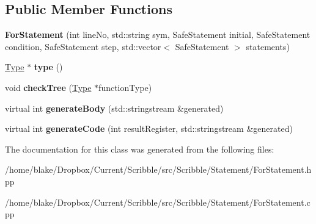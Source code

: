 \subsection*{Public Member Functions}
\begin{DoxyCompactItemize}
\item 
\hypertarget{class_scribble_core_1_1_for_statement_a3a1f10df3149454ad762a3ea291e8ade}{{\bfseries For\-Statement} (int line\-No, std\-::string sym, Safe\-Statement initial, Safe\-Statement condition, Safe\-Statement step, std\-::vector$<$ Safe\-Statement $>$ statements)}\label{class_scribble_core_1_1_for_statement_a3a1f10df3149454ad762a3ea291e8ade}

\item 
\hypertarget{class_scribble_core_1_1_for_statement_a386871e99b23b5f1244691d331c8135b}{\hyperlink{class_scribble_core_1_1_type}{Type} $\ast$ {\bfseries type} ()}\label{class_scribble_core_1_1_for_statement_a386871e99b23b5f1244691d331c8135b}

\item 
\hypertarget{class_scribble_core_1_1_for_statement_a91e40d9fd84d15bc28cd7fafa6be5aa2}{void {\bfseries check\-Tree} (\hyperlink{class_scribble_core_1_1_type}{Type} $\ast$function\-Type)}\label{class_scribble_core_1_1_for_statement_a91e40d9fd84d15bc28cd7fafa6be5aa2}

\item 
\hypertarget{class_scribble_core_1_1_for_statement_a0e5835e399600380f0b5485ca4e49f6e}{virtual int {\bfseries generate\-Body} (std\-::stringstream \&generated)}\label{class_scribble_core_1_1_for_statement_a0e5835e399600380f0b5485ca4e49f6e}

\item 
\hypertarget{class_scribble_core_1_1_for_statement_a342b11d90c876e6c4da5364947b8f34d}{virtual int {\bfseries generate\-Code} (int result\-Register, std\-::stringstream \&generated)}\label{class_scribble_core_1_1_for_statement_a342b11d90c876e6c4da5364947b8f34d}

\end{DoxyCompactItemize}


The documentation for this class was generated from the following files\-:\begin{DoxyCompactItemize}
\item 
/home/blake/\-Dropbox/\-Current/\-Scribble/src/\-Scribble/\-Statement/For\-Statement.\-hpp\item 
/home/blake/\-Dropbox/\-Current/\-Scribble/src/\-Scribble/\-Statement/For\-Statement.\-cpp\end{DoxyCompactItemize}
